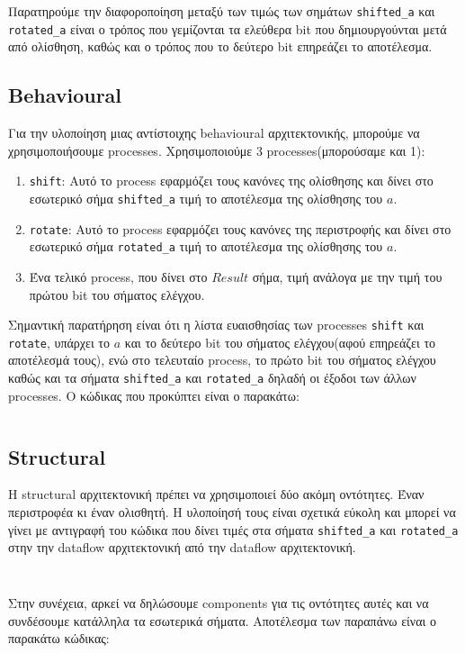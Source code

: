 \documentclass[11pt, a4paper]{report}
\begin{document}
Παρατηρούμε την διαφοροποίηση μεταξύ των τιμώς των σημάτων \texttt{shifted_a} και \texttt{rotated_a} είναι ο τρόπος που γεμίζονται τα ελεύθερα bit που δημιουργούνται μετά από ολίσθηση, καθώς και ο τρόπος που το δεύτερο bit επηρεάζει το αποτέλεσμα.

\subsection{Behavioural}
Για την υλοποίηση μιας αντίστοιχης behavioural αρχιτεκτονικής, μπορούμε να χρησιμοποιήσουμε processes.
Χρησιμοποιούμε 3 processes(μπορούσαμε και 1):
\begin{enumerate}
  \item \texttt{shift}: Αυτό το process εφαρμόζει τους κανόνες της ολίσθησης και δίνει στο εσωτερικό σήμα \texttt{shifted_a} τιμή το αποτέλεσμα της ολίσθησης του $a$.
  \item \texttt{rotate}: Αυτό το process εφαρμόζει τους κανόνες της περιστροφής και δίνει στο εσωτερικό σήμα \texttt{rotated_a} τιμή το αποτέλεσμα της ολίσθησης του $a$.
  \item Ένα τελικό process, που δίνει στο $Result$ σήμα, τιμή ανάλογα με την τιμή του πρώτου bit του σήματος ελέγχου.
\end{enumerate}

Σημαντική παρατήρηση είναι ότι η λίστα ευαισθησίας των processes \texttt{shift} και \texttt{rotate}, υπάρχει το $a$ και το δεύτερο bit του σήματος ελέγχου(αφού επηρεάζει το αποτέλεσμά τους), ενώ στο τελευταίο process, το πρώτο bit του σήματος ελέγχου καθώς και τα σήματα \texttt{shifted_a} και \texttt{rotated_a} δηλαδή οι έξοδοι των άλλων processes.
Ο κώδικας που προκύπτει είναι ο παρακάτω:
\inputminted[breaklines, linenos, firstline=32, lastline=62]{vhdl}{./code/part-2/alu-2/alu.vhdl}

\subsection{Structural}
Η structural αρχιτεκτονική πρέπει να χρησιμοποιεί δύο ακόμη οντότητες. Έναν περιστροφέα κι έναν ολισθητή.
Η υλοποίησή τους είναι σχετικά εύκολη και μπορεί να γίνει με αντιγραφή του κώδικα που δίνει τιμές στα σήματα \texttt{shifted_a} και \texttt{rotated_a} στην την dataflow αρχιτεκτονική από την dataflow αρχιτεκτονική.
\inputminted[breaklines, linenos]{vhdl}{./code/part-2/alu-2/shiftlr_4bit.vhdl}
\inputminted[breaklines, linenos]{vhdl}{./code/part-2/alu-2/rotatelr_4bit.vhdl}

Στην συνέχεια, αρκεί να δηλώσουμε components για τις οντότητες αυτές και να συνδέσουμε κατάλληλα τα εσωτερικά σήματα.
Αποτέλεσμα των παραπάνω είναι ο παρακάτω κώδικας:
\inputminted[breaklines, linenos, firstline=64]{vhdl}{./code/part-2/alu-2/alu.vhdl}
\end{document}
